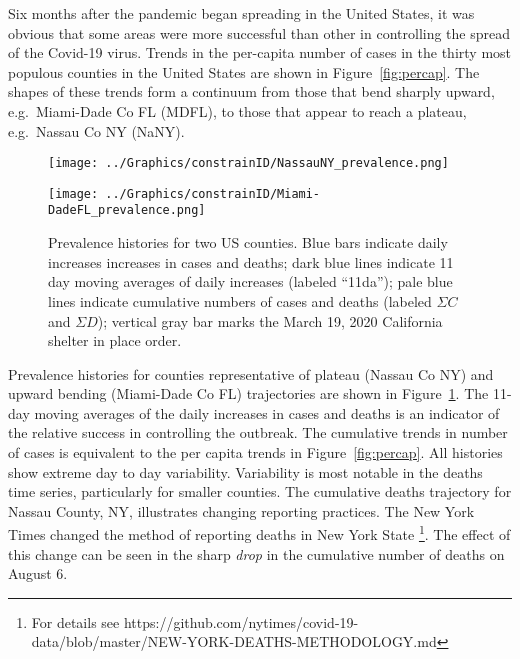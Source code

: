 \documentclass[12pt,letterpaper]{article}
\newcommand\EG{e.g.\ }
\begin{document}

Six months after the pandemic began spreading in the United States, it
was obvious that some areas were more successful than other
in controlling the spread of the Covid-19 virus.
Trends in the per-capita number of cases in the thirty most populous 
counties in the United States are shown in Figure~\ref{fig:percap}.
The shapes of these trends form a continuum from those that bend
sharply upward, \EG Miami-Dade Co FL (MDFL),  to
those that appear to reach a plateau, \EG Nassau Co NY (NaNY). 


\begin{figure}
{\scriptsize
\begin{center}
\texttt{[image: ../Graphics/constrainID/NassauNY\_prevalence.png]}
 
\vspace{0.5truein}

\texttt{[image: ../Graphics/constrainID/Miami-DadeFL\_prevalence.png]}
\end{center}
}
\caption{\label{fig:prev}
Prevalence histories for two US counties.
Blue bars indicate daily increases increases in cases and deaths;
dark blue lines indicate 11 day moving averages of
daily increases (labeled ``11da'');
pale blue lines indicate cumulative numbers of cases and deaths
(labeled $\Sigma C$ and $\Sigma D$); 
vertical gray bar marks the March 19, 2020 California shelter in place order.
}
\end{figure}

Prevalence histories for counties representative of plateau
(Nassau Co NY)
and upward bending (Miami-Dade Co FL) trajectories are shown in
Figure~\ref{fig:prev}. The 11-day moving averages of the daily
increases in cases and deaths is an indicator of the
relative success in controlling the outbreak.
The cumulative trends in number of cases is equivalent to 
the per capita trends in Figure~\ref{fig:percap}.
All histories show extreme day to day variability.
Variability is most notable in the deaths
time series, particularly for smaller counties.
The cumulative deaths trajectory for Nassau County, NY, illustrates
changing reporting practices. The New York Times changed the method of
reporting deaths in New York State 
\footnote{For details see
https://github.com/nytimes/covid-19-data/blob/master/NEW-YORK-DEATHS-METHODOLOGY.md}.
The effect of this change can be seen in the sharp {\itshape drop} in
the cumulative number of deaths on August 6.
\end{document}
